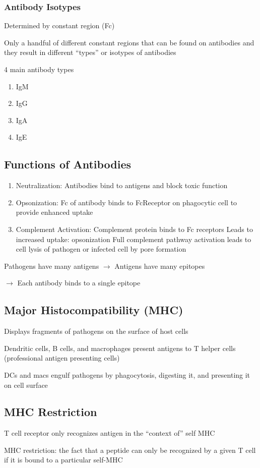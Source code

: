 \documentclass{notes}
\begin{document}
\subsubsection*{Antibody Isotypes}
Determined by constant region (Fc)

Only a handful of different constant regions that can be found on antibodies and they result in different ``types'' or isotypes of antibodies

4 main antibody types
\begin{enumerate}
    \item IgM
    \item IgG
    \item IgA
    \item IgE
\end{enumerate}

\subsection*{Functions of Antibodies}
\begin{enumerate}
    \item Neutralization: Antibodies bind to antigens and block toxic function
    \item Opsonization: Fc of antibody binds to FcReceptor on phagocytic cell to provide enhanced uptake
    \item Complement Activation: Complement protein binds to Fc receptors
    \subitem Leads to increased uptake: opsonization
    \subitem Full complement pathway activation leads to cell lysis of pathogen or infected cell by pore formation
\end{enumerate}

Pathogens have many antigens \(\rightarrow\) Antigens have many epitopes

\hspace*{10px} \(\rightarrow\) Each antibody binds to a single epitope

\subsection*{Major Histocompatibility (MHC)}
Displays fragments of pathogens on the surface of host cells

Dendritic cells, B cells, and macrophages present antigens to T helper cells (professional antigen presenting cells)

DCs and macs engulf pathogens by phagocytosis, digesting it, and presenting it on cell surface

\subsection*{MHC Restriction}
T cell receptor only recognizes antigen in the ``context of'' self MHC

MHC restriction: the fact that a peptide can only be recognized by a given T cell if it is bound to a particular self-MHC
\end{document}
